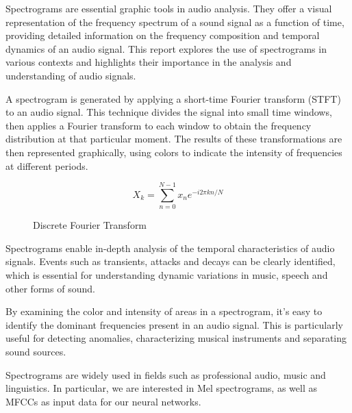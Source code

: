 \documentclass[11pt]{article}
\begin{document}
Spectrograms are essential graphic tools in audio analysis. They offer a visual representation of the frequency spectrum of a sound signal as a function of time, providing detailed information on the frequency composition and temporal dynamics of an audio signal. This report explores the use of spectrograms in various contexts and highlights their importance in the analysis and understanding of audio signals.

A spectrogram is generated by applying a short-time Fourier transform (STFT) to an audio signal. This technique divides the signal into small time windows, then applies a Fourier transform to each window to obtain the frequency distribution at that particular moment. The results of these transformations are then represented graphically, using colors to indicate the intensity of frequencies at different periods.



\begin{figure}[h]
    \begin{equation}
      X_k = \sum_{n=0}^{N-1} x_n e^{-i 2 \pi k n / N}
      \label{eq:fourier_transform}
    \end{equation}
    \caption{Discrete Fourier Transform}
\end{figure}

Spectrograms enable in-depth analysis of the temporal characteristics of audio signals. Events such as transients, attacks and decays can be clearly identified, which is essential for understanding dynamic variations in music, speech and other forms of sound.

By examining the color and intensity of areas in a spectrogram, it's easy to identify the dominant frequencies present in an audio signal. This is particularly useful for detecting anomalies, characterizing musical instruments and separating sound sources.

Spectrograms are widely used in fields such as professional audio, music and linguistics. In particular, we are interested in Mel spectrograms, as well as MFCCs as input data for our neural networks.
\end{document}
